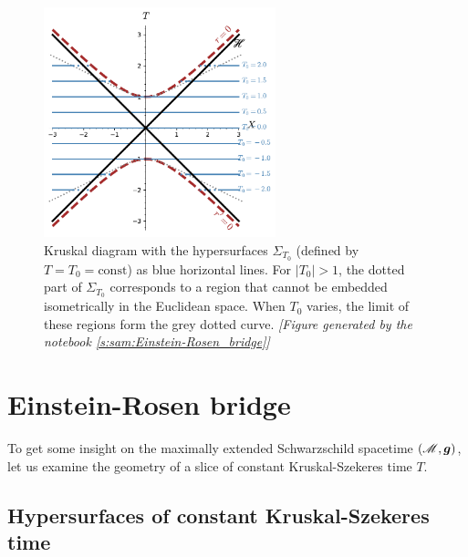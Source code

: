 \begin{figure}
\centerline{\includegraphics[width=0.6\textwidth]{max_constant_T_slices.pdf}}
\caption[]{\label{f:max:constant_T_slices} \footnotesize
Kruskal diagram with the hypersurfaces $\Sigma_{T_0}$ (defined by $T=T_0 = \mathrm{const}$) as blue horizontal lines. For $|T_0|>1$, the dotted part of
$\Sigma_{T_0}$ corresponds to a region that cannot be embedded isometrically in
the Euclidean space. When $T_0$ varies, the limit of these regions form
the grey dotted curve.
\textsl{[Figure generated by the notebook \ref{s:sam:Einstein-Rosen_bridge}]}
}
\end{figure}

\section{Einstein-Rosen bridge} \label{s:max:ER_bridge}

To get some insight on the maximally extended Schwarzschild
spacetime $(\mathscr{M},\bm{g})$, let us examine the geometry of a slice of constant
Kruskal-Szekeres time $T$.

\subsection{Hypersurfaces of constant Kruskal-Szekeres time} \label{s:max:hyp_const_T}


